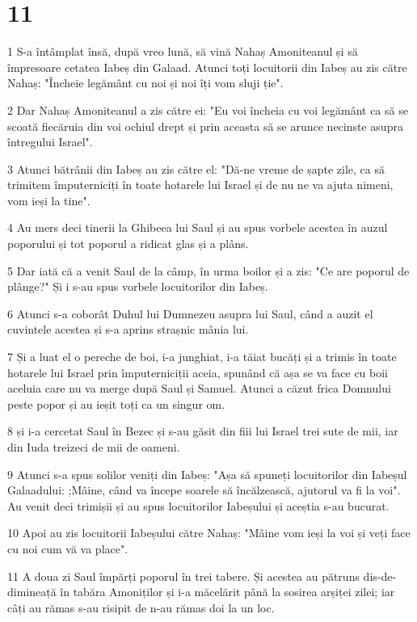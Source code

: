 \chapter{11}

\par 1 S-a întâmplat însă, după vreo lună, să vină Nahaș Amoniteanul și să împresoare cetatea Iabeș din Galaad. Atunci toți locuitorii din Iabeș au zis către Nahaș: "Încheie legământ cu noi și noi îți vom sluji ție".
\par 2 Dar Nahaș Amoniteanul a zis către ei: "Eu voi încheia cu voi legământ ca să se scoată fiecăruia din voi ochiul drept și prin aceasta să se arunce necinste asupra întregului Israel".
\par 3 Atunci bătrânii din Iabeș au zis către el: "Dă-ne vreme de șapte zile, ca să trimitem împuterniciți în toate hotarele lui Israel și de nu ne va ajuta nimeni, vom ieși la tine".
\par 4 Au mers deci tinerii la Ghibeea lui Saul și au spus vorbele acestea în auzul poporului și tot poporul a ridicat glas și a plâns.
\par 5 Dar iată că a venit Saul de la câmp, în urma boilor și a zis: "Ce are poporul de plânge?" Și i s-au spus vorbele locuitorilor din Iabeș.
\par 6 Atunci s-a coborât Duhul lui Dumnezeu asupra lui Saul, când a auzit el cuvintele acestea și s-a aprins strașnic mânia lui.
\par 7 Și a luat el o pereche de boi, i-a junghiat, i-a tăiat bucăți și a trimis în toate hotarele lui Israel prin împuterniciții aceia, spunând că așa se va face cu boii aceluia care nu va merge după Saul și Samuel. Atunci a căzut frica Domnului peste popor și au ieșit toți ca un singur om.
\par 8 și i-a cercetat Saul în Bezec și s-au găsit din fiii lui Israel trei sute de mii, iar din Iuda treizeci de mii de oameni.
\par 9 Atunci s-a spus solilor veniți din Iabeș: "Așa să spuneți locuitorilor din Iabeșul Galaadului: ;Mâine, când va începe soarele să încălzească, ajutorul va fi la voi". Au venit deci trimișii și au spus locuitorilor Iabeșului și aceștia s-au bucurat.
\par 10 Apoi au zis locuitorii Iabeșului către Nahaș: "Mâine vom ieși la voi și veți face cu noi cum vă va place".
\par 11 A doua zi Saul împărți poporul în trei tabere. Și acestea au pătruns dis-de-dimineață în tabăra Amoniților și i-a măcelărit până la sosirea arșiței zilei; iar câți au rămas s-au risipit de n-au rămas doi la un loc.
